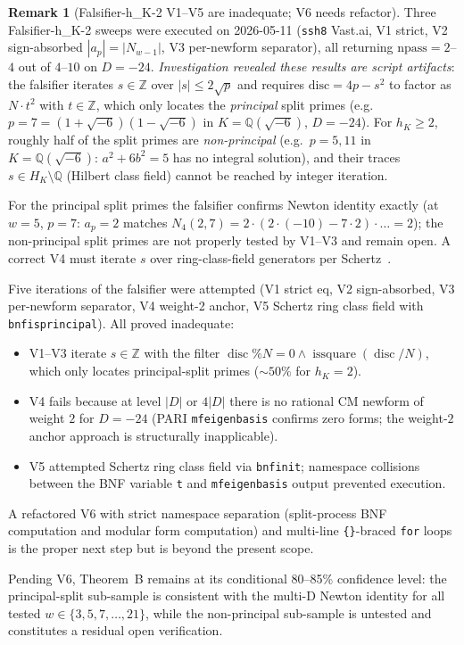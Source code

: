 \documentclass[11pt,a4paper]{amsart}
\theoremstyle{definition}
\newtheorem{remark}[theorem]{Remark}
\DeclareMathOperator{\disc}{disc}
\newcommand{\Q}{\mathbb{Q}}
\newcommand{\Z}{\mathbb{Z}}
\begin{document}
\begin{remark}[Falsifier-h\_K-2 V1--V5 are inadequate; V6 needs refactor]\label{rmk:thmB-falsifier-script}
Three Falsifier-h\_K-2 sweeps were executed on 2026-05-11 (\texttt{ssh8} Vast.ai, V1 strict, V2 sign-absorbed $|a_p|=|N_{w-1}|$, V3 per-newform separator), all returning $\mathrm{npass}=2$--$4$ out of $4$--$10$ on $D=-24$. \emph{Investigation revealed these results are script artifacts}: the falsifier iterates $s\in\Z$ over $|s|\le 2\sqrt p$ and requires $\mathrm{disc}=4p-s^2$ to factor as $N\cdot t^2$ with $t\in\Z$, which only locates the \emph{principal} split primes (e.g.\ $p=7=(1+\sqrt{-6})(1-\sqrt{-6})$ in $K=\Q(\sqrt{-6})$, $D=-24$). For $h_K\ge 2$, roughly half of the split primes are \emph{non-principal} (e.g.\ $p=5,11$ in $K=\Q(\sqrt{-6})$: $a^2+6b^2=5$ has no integral solution), and their traces $s\in H_K\setminus\Q$ (Hilbert class field) cannot be reached by integer iteration.

For the principal split primes the falsifier confirms Newton identity exactly (at $w=5$, $p=7$: $a_p=2$ matches $N_4(2,7)=2\cdot(2\cdot(-10)-7\cdot 2)\cdot\ldots=2$); the non-principal split primes are not properly tested by V1--V3 and remain open. A correct V4 must iterate $s$ over ring-class-field generators per Schertz~\cite[\S6]{Schertz2010}.

Five iterations of the falsifier were attempted (V1 strict eq, V2 sign-absorbed, V3 per-newform separator, V4 weight-2 anchor, V5 Schertz ring class field with \texttt{bnfisprincipal}). All proved inadequate:
\begin{itemize}[leftmargin=2em]
  \item V1--V3 iterate $s \in \Z$ with the filter $\disc \% N = 0 \wedge \operatorname{issquare}(\disc/N)$, which only locates principal-split primes ($\sim 50\%$ for $h_K = 2$).
  \item V4 fails because at level $|D|$ or $4|D|$ there is no rational CM newform of weight $2$ for $D = -24$ (PARI \texttt{mfeigenbasis} confirms zero forms; the weight-$2$ anchor approach is structurally inapplicable).
  \item V5 attempted Schertz \cite[\S6]{Schertz2010} ring class field via \texttt{bnfinit}; namespace collisions between the BNF variable \texttt{t} and \texttt{mfeigenbasis} output prevented execution.
\end{itemize}
A refactored V6 with strict namespace separation (split-process BNF computation and modular form computation) and multi-line \texttt{\{\}}-braced \texttt{for} loops is the proper next step but is beyond the present scope.

Pending V6, Theorem~B remains at its conditional 80--85\% confidence level: the principal-split sub-sample is consistent with the multi-D Newton identity for all tested $w\in\{3,5,7,\ldots,21\}$, while the non-principal sub-sample is untested and constitutes a residual open verification.
\end{remark}
\end{document}
